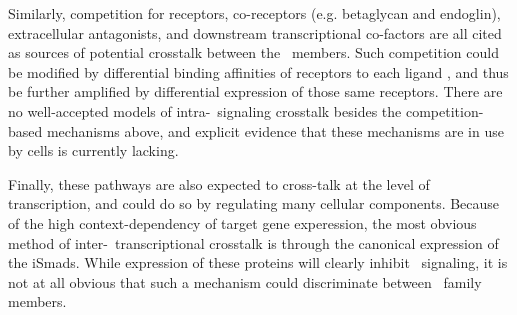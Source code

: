 Similarly, competition for receptors, co-receptors (e.g. betaglycan \cite{Bilandzic2011}
and endoglin), extracellular antagonists, and
downstream transcriptional co-factors are all cited as sources of
potential crosstalk between the \tgfbsf\ members. Such competition could be
modified by differential binding affinities of receptors to each ligand
\cite{Groppe2008,Ehrlich2011}, and thus be further amplified by differential
expression of those same receptors.
There are no well-accepted models of intra-\tgfbsf\ signaling crosstalk besides the
competition-based mechanisms above, and explicit evidence that these mechanisms
are in use by cells is currently lacking.


Finally, these pathways are also expected to cross-talk at the level of transcription,
and could do so by regulating many cellular components. Because of the high context-dependency
of target gene experession, the most obvious method of inter-\tgfbsf\ transcriptional crosstalk
is through the canonical expression of the iSmads. While expression of
these proteins will clearly inhibit \tgfbsf\ signaling, it is not at all obvious
that such a mechanism could discriminate between \tgfbsf\ family members.

